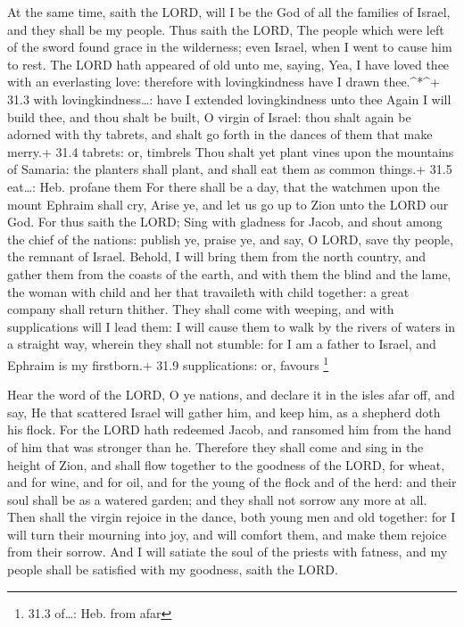  At the same time, saith the LORD, will I be the God of all
the families of Israel, and they shall be my people.  Thus
saith the LORD, The people which were left of the sword found grace in
the wilderness; even Israel, when I went to cause him to rest.
 The LORD hath appeared of old unto me, saying, Yea, I have
loved thee with an everlasting love: therefore with lovingkindness have
I drawn thee.\^{}*\^{}+ 31.3 with lovingkindness\ldots: have I extended
lovingkindness unto thee  Again I will build thee, and thou
shalt be built, O virgin of Israel: thou shalt again be adorned with thy
tabrets, and shalt go forth in the dances of them that make merry.+ 31.4
tabrets: or, timbrels  Thou shalt yet plant vines upon the
mountains of Samaria: the planters shall plant, and shall eat them as
common things.+ 31.5 eat\ldots: Heb. profane them  For there
shall be a day, that the watchmen upon the mount Ephraim shall cry,
Arise ye, and let us go up to Zion unto the LORD our God. 
For thus saith the LORD; Sing with gladness for Jacob, and shout among
the chief of the nations: publish ye, praise ye, and say, O LORD, save
thy people, the remnant of Israel.  Behold, I will bring
them from the north country, and gather them from the coasts of the
earth, and with them the blind and the lame, the woman with child and
her that travaileth with child together: a great company shall return
thither.  They shall come with weeping, and with
supplications will I lead them: I will cause them to walk by the rivers
of waters in a straight way, wherein they shall not stumble: for I am a
father to Israel, and Ephraim is my firstborn.+ 31.9 supplications: or,
favours \footnote{31.3 of\ldots: Heb. from afar}

 Hear the word of the LORD, O ye nations, and declare it in
the isles afar off, and say, He that scattered Israel will gather him,
and keep him, as a shepherd doth his flock.  For the LORD
hath redeemed Jacob, and ransomed him from the hand of him that was
stronger than he.  Therefore they shall come and sing in
the height of Zion, and shall flow together to the goodness of the LORD,
for wheat, and for wine, and for oil, and for the young of the flock and
of the herd: and their soul shall be as a watered garden; and they shall
not sorrow any more at all.  Then shall the virgin rejoice
in the dance, both young men and old together: for I will turn their
mourning into joy, and will comfort them, and make them rejoice from
their sorrow.  And I will satiate the soul of the priests
with fatness, and my people shall be satisfied with my goodness, saith
the LORD.


